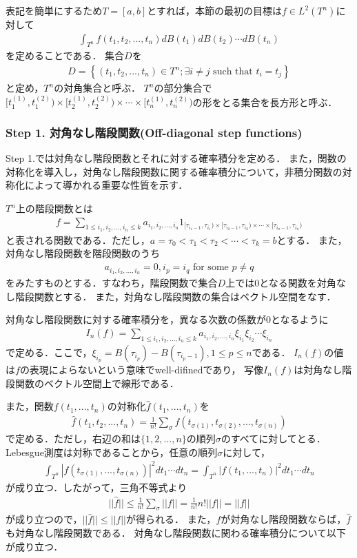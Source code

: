 \documentclass[a4paper,10pt]{jsarticle}
\theoremstyle{definition}
\newcommand{\eq}[1]{\begin{align}#1\end{align}}
\begin{document}
表記を簡単にするため$T=[a,b]$とすれば，本節の最初の目標は$f\in L^2(T^n)$に対して
\eq{\int_{T^n}f(t_1,t_2,...,t_n)dB(t_1)dB(t_2)\cdots dB(t_n)}
を定めることである．
集合$D$を
\eq{D=\left\{(t_1,t_2,...,t_n)\in T^n;\exists i\neq j\text{ such that }t_i=t_j\right\}}
と定め，$T^n$の対角集合と呼ぶ．
$T^n$の部分集合で$[t_1^{(1)},t_1^{(2)})\times[t_2^{(1)},t_2^{(2)})\times\cdots\times[t_n^{(1)},t_n^{(2)})$の形をとる集合を長方形と呼ぶ．

\subsubsection*{Step 1. 対角なし階段関数(Off-diagonal step functions)}
Step 1.では対角なし階段関数とそれに対する確率積分を定める．
また，関数の対称化を導入し，対角なし階段関数に関する確率積分について，非積分関数の対称化によって導かれる重要な性質を示す．

$T^n$上の階段関数とは
\eq{f=\sum_{1\le i_1,i_2,...,i_n\le k}a_{i_1,i_2,...,i_n}1_{[\tau_{i_1-1},\tau_{i_1})\times[\tau_{i_2-1},\tau_{i_2})\times\cdots\times[\tau_{i_n-1},\tau_{i_n})}}
と表される関数である．ただし，$a=\tau_0<\tau_1<\tau_2<\cdots<\tau_k=b$とする．
また，対角なし階段関数を階段関数のうち
\eq{a_{i_1,i_2,...,i_n}=0,i_p=i_q\text{ for some }p\neq q}
をみたすものとする．すなわち，階段関数で集合$D$上では$0$となる関数を対角なし階段関数とする．
また，対角なし階段関数の集合はベクトル空間をなす．

対角なし階段関数に対する確率積分を，異なる次数の係数が$0$となるように
\eq{I_n(f)=\sum_{1\le i_1,i_2,...,i_n\le k}a_{i_1,i_2,...,i_n}\xi_{i_1}\xi_{i_2}\cdots\xi_{i_n}}
で定める．ここで，$\xi_{i_p}=B(\tau_{i_p})-B(\tau_{i_p-1}),1\le p\le n$である．
$I_n(f)$の値は$f$の表現によらないという意味でwell-difinedであり，
写像$I_n(f)$は対角なし階段関数のベクトル空間上で線形である．

また，関数$f(t_1,...,t_n)$の対称化$\hat{f}(t_1,...,t_n)$を
\eq{\hat{f}(t_1,t_2,...,t_n)=\frac{1}{n!}\sum_\sigma f(t_{\sigma(1)},t_{\sigma(2)},...,t_{\sigma(n)})\label{symfunc}}
で定める．ただし，右辺の和は$\{1,2,...,n\}$の順列$\sigma$のすべてに対してとる．
Lebesgue測度は対称であることから，任意の順列$\sigma$に対して，
\eq{\int_{T^n}|f(t_{\sigma(1)},...,t_{\sigma(n)})|^2dt_1\cdots dt_n=\int_{T^n}|f(t_1,...,t_n)|^2dt_1\cdots dt_n}
が成り立つ．したがって，三角不等式より
\eq{||\hat{f}||\le\frac{1}{n!}\sum_\sigma||f||=\frac{1}{n!}n!||f||=||f||}
が成り立つので，$||\hat{f}||\le||f||$が得られる．
また，$f$が対角なし階段関数ならば，$\hat{f}$も対角なし階段関数である．
対角なし階段関数に関わる確率積分について以下が成り立つ．
\end{document}
